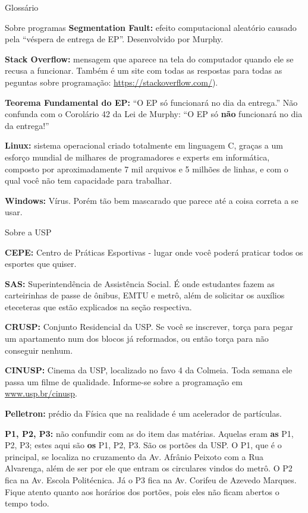 \begin{secao}{Glossário}
\begin{subsecao}{Sobre programas}
{\bf Segmentation Fault:} efeito computacional aleatório causado pela ``véspera
de entrega de EP''. Desenvolvido por Murphy.

{\bf Stack Overflow:} mensagem que aparece na tela do computador
quando ele se recusa a funcionar. Também é um site com todas as respostas
para todas as peguntas sobre programação: \url{https://stackoverflow.com/}).

{\bf Teorema Fundamental do EP:} ``O EP só funcionará no dia da entrega.'' Não
confunda com o Corolário 42 da Lei de Murphy: ``O EP só {\bf não} funcionará no
dia da entrega!''

{\bf Linux:} sistema operacional criado totalmente em linguagem C, graças a um
esforço mundial de milhares de programadores e experts em informática, composto
por aproximadamente 7 mil arquivos e 5 milhões de linhas, e com o qual você não
tem capacidade para trabalhar.

{\bf Windows:} Vírus. Porém tão bem mascarado que parece até a coisa correta a
se usar.
\end{subsecao}

\begin{subsecao}{Sobre a USP}

{\bf CEPE:} Centro de Práticas Esportivas - lugar onde você poderá praticar
todos os esportes que quiser.

{\bf SAS:} Superintendência de Assistência Social. É onde estudantes fazem as
carteirinhas de passe de ônibus, EMTU e metrô, além de solicitar os auxílios
eteceteras que estão explicados na seção respectiva.

{\bf CRUSP:} Conjunto Residencial da USP. Se você se inscrever, torça para
pegar um apartamento num dos blocos já reformados, ou então torça para não
conseguir nenhum.



{\bf CINUSP:} Cinema da USP, localizado no favo 4 da Colmeia. Toda semana ele
passa um filme de qualidade. Informe-se sobre a programação em
\url{www.usp.br/cinusp}.

{\bf Pelletron:} prédio da Física que na realidade é um acelerador de
partículas.

{\bf P1, P2, P3:} não confundir com as do item das matérias. Aquelas eram
{\bf as} P1, P2, P3; estes aqui são {\bf os} P1, P2, P3. São os portões da USP.
O P1, que é o principal, se localiza no cruzamento da Av. Afrânio Peixoto com a
Rua Alvarenga, além de ser por ele que entram os circulares vindos do metrô.
O P2 fica na Av. Escola Politécnica. Já o P3 fica na Av. Corifeu de Azevedo
Marques. Fique atento quanto aos horários dos portões, pois eles não ficam
abertos o tempo todo.


\end{subsecao}
\end{secao}
